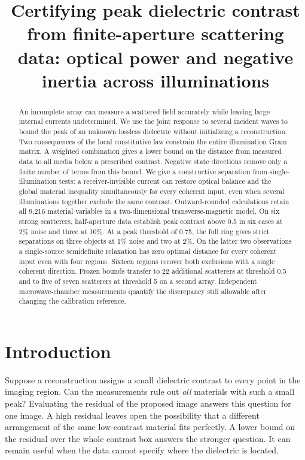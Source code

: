 \documentclass[anonymous,12pt]{iopjournal}
\theoremstyle{remark}\newtheorem{remark}[theorem]{Remark}
\numberwithin{equation}{section}
\begin{document}
\par\vspace{1.8ex}
\title{Certifying peak dielectric contrast from finite-aperture scattering data: optical power and negative inertia across illuminations}
\author{}
\begin{abstract}
An incomplete array can measure a scattered field accurately while leaving large internal currents undetermined. We use the joint response to several incident waves to bound the peak of an unknown lossless dielectric without initializing a reconstruction. Two consequences of the local constitutive law constrain the entire illumination Gram matrix. A weighted combination gives a lower bound on the distance from measured data to all media below a prescribed contrast. Negative state directions remove only a finite number of terms from this bound. We give a constructive separation from single-illumination tests: a receiver-invisible current can restore optical balance and the global material inequality simultaneously for every coherent input, even when several illuminations together exclude the same contrast. Outward-rounded calculations retain all 9,216 material variables in a two-dimensional transverse-magnetic model. On six strong scatterers, half-aperture data establish peak contrast above 0.5 in six cases at 2\% noise and three at 10\%. At a peak threshold of 0.75, the full ring gives strict separations on three objects at 1\% noise and two at 2\%. On the latter two observations a single-source semidefinite relaxation has zero optimal distance for every coherent input even with four regions. Sixteen regions recover both exclusions with a single coherent direction. Frozen bounds transfer to 22 additional scatterers at threshold 0.5 and to five of seven scatterers at threshold 5 on a second array. Independent microwave-chamber measurements quantify the discrepancy still allowable after changing the calibration reference.
\end{abstract}

\section{Introduction}\label{sec:intro}

Suppose a reconstruction assigns a small dielectric contrast to every point in the imaging region. Can the measurements rule out \emph{all} materials with such a small peak? Evaluating the residual of the proposed image answers this question for one image. A high residual leaves open the possibility that a different arrangement of the same low-contrast material fits perfectly. A lower bound on the residual over the whole contrast box answers the stronger question. It can remain useful when the data cannot specify where the dielectric is located.
\end{document}
